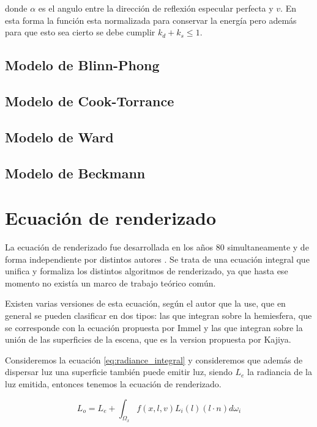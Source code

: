 donde $\alpha$ es el angulo entre la dirección de reflexión especular perfecta y $v$.
En esta forma la función esta normalizada para conservar la energía pero además para que esto sea cierto se debe cumplir $k_d + k_s \leq 1$.

 

\subsection{Modelo de Blinn-Phong}

\subsection{Modelo de Cook-Torrance}

\subsection{Modelo de Ward}

\subsection{Modelo de Beckmann}

\clearpage

\section{Ecuación de renderizado}

La ecuación de renderizado fue desarrollada en los años 80 simultaneamente y de forma independiente por distintos autores \cite{Kajiya1986, Immel1986}. Se trata de una ecuación integral que unifica y formaliza los distintos algoritmos de renderizado, ya que hasta ese momento no existía un marco de trabajo teórico común.

\medskip
Existen varias versiones de esta ecuación, según el autor que la use, que en general se pueden clasificar en dos tipos: las que integran sobre la hemiesfera, que se corresponde con la ecuación propuesta por Immel y las que integran sobre la unión de las superficies de la escena, que es la version propuesta por Kajiya.
\medskip

Consideremos la ecuación \ref{eq:radiance_integral}  y consideremos que además de dispersar luz una superficie también puede emitir luz, siendo $L_e$ la radiancia de la luz emitida, entonces tenemos la ecuación de renderizado.

\begin{equation}
L _ o = L_e + \int_{\Omega_x} f(x, l, v) L_i(l) (l \cdot n) d\omega_i 
\end{equation}

